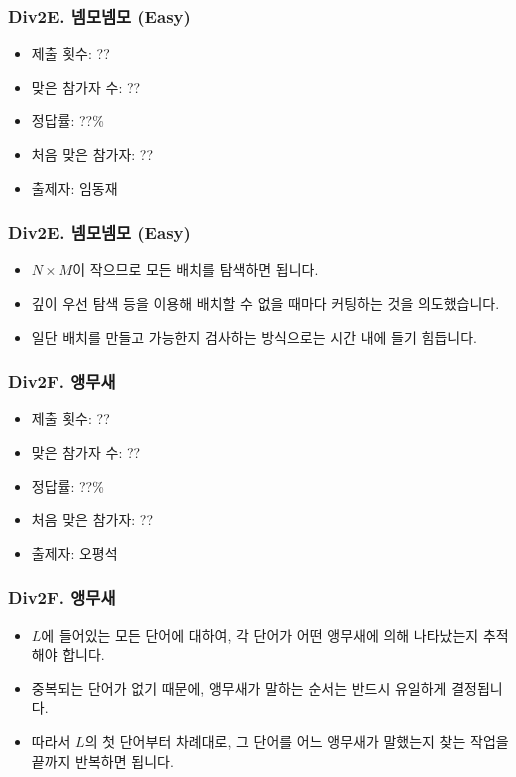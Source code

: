 \documentclass[xetex]{beamer}
\begin{document}
\begin{frame}
  \frametitle{Div2E. 넴모넴모 (Easy)}
  \begin{itemize}
    \item 제출 횟수: ??
    \item 맞은 참가자 수: ??
    \item 정답률: ??\%
    \item 처음 맞은 참가자: ??
    \item 출제자: 임동재
  \end{itemize}
\end{frame}

\begin{frame}
  \frametitle{Div2E. 넴모넴모 (Easy)}
  \begin{itemize}
    \item $N \times M$이 작으므로 모든 배치를 탐색하면 됩니다.
    \item 깊이 우선 탐색 등을 이용해 배치할 수 없을 때마다 커팅하는 것을 의도했습니다.
    \item 일단 배치를 만들고 가능한지 검사하는 방식으로는 시간 내에 들기 힘듭니다.
  \end{itemize}
\end{frame}

\begin{frame}
  \frametitle{Div2F. 앵무새}
  \begin{itemize}
    \item 제출 횟수: ??
    \item 맞은 참가자 수: ??
    \item 정답률: ??\%
    \item 처음 맞은 참가자: ??
    \item 출제자: 오평석
  \end{itemize}
\end{frame}

\begin{frame}
  \frametitle{Div2F. 앵무새}
  \begin{itemize}
    \item $L$에 들어있는 모든 단어에 대하여, 각 단어가 어떤 앵무새에 의해 나타났는지 추적해야 합니다.
    \item 중복되는 단어가 없기 때문에, 앵무새가 말하는 순서는 반드시 유일하게 결정됩니다.
    \item 따라서 $L$의 첫 단어부터 차례대로, 그 단어를 어느 앵무새가 말했는지 찾는 작업을 끝까지 반복하면 됩니다.
  \end{itemize}
\end{frame}
\end{document}
